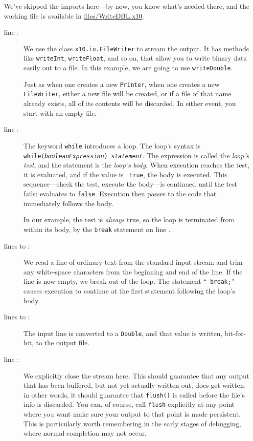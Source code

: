 We've skipped the imports here---by now, you know what's needed there, and the
working file is available in
\href{http://dist.codehaus.org/x10/documentation/guide/src/files/WriteDBL.x10}{files/WriteDBL.x10}.
\begin{description}
\item[line :] We use the class {\tt x10.io.FileWriter} to stream the output. 
It has methods like {\tt writeInt}, {\tt writeFloat}, and so on, that allow you
to write binary data easily out to a file.  In this example, we are going to use
{\tt writeDouble}.

Just as when one creates a new {\tt Printer}, when one creates a new {\tt
FileWriter}, either a new file will be created, or if a file of that
name already exists, all of its contents will be discarded.  In either event,
you start with an empty file.
\item[line :] The keyword {\tt while} introduces a loop.  The loop's syntax is
{\tt while({\em boolean\-Expres\-sion}) {\em statement}}.  The expression is
called the {\em loop's test}, and the statement is the {\em loop's body}. 
When execution reaches the test, it is evaluated, and if the value is {\tt
true}, the body is executed. This sequence---check the test, execute the
body---is continued until the test fails: \ie{} evaluates to {\tt false}.
Execution then passes to the code that immediately follows the body.

In our example, the test is {\em always} true, so the loop is 
terminated from within its body, by the {\tt break} statement on line .  
\item[lines  to :] We read a line of ordinary text from the standard input
stream and trim any white-space characters from the beginning and end of the
line.  If the line is now empty, we break out of the loop.  The statement ``{\tt
break;}'' causes execution to continue at the first statement following the
loop's body.
\item[lines  to :] The input line is converted to a {\tt Double}, and that
value is written, bit-for-bit, to the output file.
\item[line :] We explicitly close the stream here.  This should guarantee that
any output that has been buffered, but not yet actually written out, does
get written: in other words, it should guarantee that {\tt flush()} is called
before the file's info is discarded.  You can, of course, call {\tt flush}
explicitly at any point where you want make sure your output to that point is
made persistent. This is particularly worth remembering in the early stages of
debugging, where normal completion may not occur.
\end{description}
